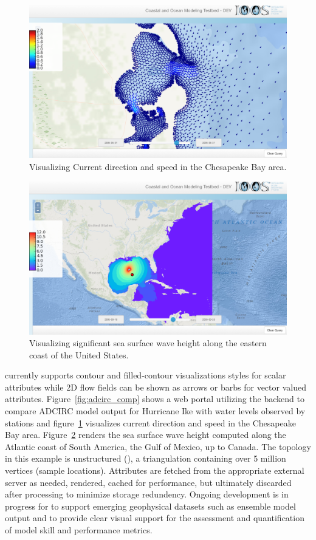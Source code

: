 \else
\begin{figure}[ht!]
  \centering
  \includegraphics[width=0.8\columnwidth]{../figs/vims_selfe_ubaratropic_vbaratropic_chesapeake_bay_crop_695_0_2125_1265}
  \caption{Visualizing Current direction and speed in the
    Chesapeake Bay area.}
  \label{fig:vims_selfe_chesapeake}
\end{figure}
\begin{figure}[ht!]
  \centering
  \includegraphics[width=0.8\columnwidth]{../figs/inundation_tropical_VIMS_SELFE_hurricane_rita_2d_final_run_with_waves_sea_surface_wave_significant_height_crop_695_0_2125_1265}
  \caption{Visualizing significant sea surface wave
    height along the eastern coast of the United States.}
  \label{fig:vims_selfe_ssh}
\end{figure}
\fi

\sciwms{} currently supports contour and filled-contour visualizations
styles for scalar attributes while 2D flow fields can be shown as
arrows or barbs for vector valued
attributes. Figure~\ref{fig:adcirc_comp} shows a web portal utilizing
the \sciwms{} backend to compare ADCIRC model output for Hurricane Ike
with water levels observed by \noaa{} stations and
figure~\ref{fig:vims_selfe_chesapeake} visualizes current direction
and speed in the Chesapeake Bay area. Figure~\ref{fig:vims_selfe_ssh}
renders the sea surface wave height computed along the Atlantic coast
of South America, the Gulf of Mexico, up to Canada. The topology in
this example is unstructured (\ugrid{}), a triangulation containing
over 5 million vertices (sample locations). Attributes are fetched
from the appropriate external server as needed, rendered, cached for
performance, but ultimately discarded after processing to minimize
storage redundency. Ongoing development is in progress for \sciwms{}
to support emerging geophysical datasets such as ensemble model output
and to provide clear visual support for the assessment and
quantification of model skill and performance metrics.
\FloatBarrier
